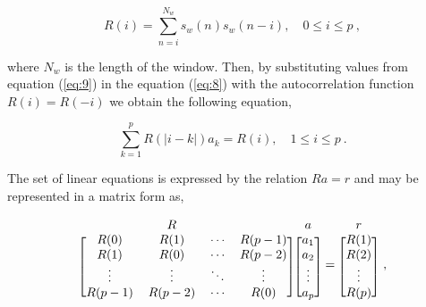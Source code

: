 \documentclass[cryptography,article,submit,moreauthors,pdftex,10pt,a4paper]{mdpi}
\begin{document}
\begin{equation}
\label{eq:9}
  	R(i) = \sum\limits_{n=i}^{N_w}s_w(n)s_w(n-i),\quad 0\leq i \leq p~,
\end{equation}

\noindent where $N_w$ is the length of the window. Then, by substituting values from equation (\ref{eq:9}) in the equation (\ref{eq:8}) with the autocorrelation function $R(i) = R(-i)$ we obtain the following equation,

\begin{equation}
\label{eq:10}
  	\sum\limits_{k=1}^{p}R(\vert i-k \vert )a_k = R(i),\quad 1\leq i \leq p~.
\end{equation}

The set of linear equations is expressed by the relation $Ra = r$ and may be represented in a matrix form as,

\begin{equation}
\label{eq:11}
	\begin{blockarray}{cccc}
			~ & R & ~ & ~ \\
			\begin{block}{[cccc]}
				R(0) & R(1) & \cdots & R(p-1) \\
				R(1) & R(0) & \cdots & R(p-2) \\
				\vdots & \vdots & \ddots & \vdots \\
				R(p-1) & R(p-2) & \cdots & R(0) \\
			\end{block}
		\end{blockarray}
		\begin{blockarray}{c}
			a\\
			\begin{block}{[c]}
				a_1\\
				a_2\\
				\vdots\\
				a_p\\
			\end{block}
		\end{blockarray}
		=
		\begin{blockarray}{c}
			r\\
			\begin{block}{[c]}
				R(1)\\
				R(2)\\
				\vdots\\
				R(p)\\
			\end{block}
		\end{blockarray}~,
\end{equation}
\end{document}
